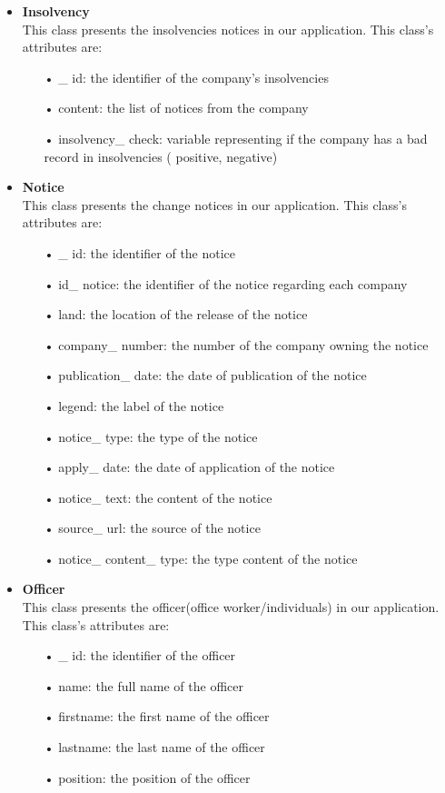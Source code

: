 \begin{itemize}
\begin{itemize}
\end{itemize}
\item \textbf{Insolvency}\\
This class presents the insolvencies notices in our application. This class's attributes are:
\begin{itemize}
\item[•] \_ id: the identifier of the company's insolvencies
\item[•] content: the list of notices from the company
\item[•] insolvency\_ check: variable representing if the company has a bad record in insolvencies ( positive, negative)
\end{itemize}
\item \textbf{Notice}\\
This class presents the change notices in our application. This class's attributes are:
\begin{itemize}
\item[•] \_ id: the identifier of the notice
\item[•] id\_ notice: the identifier of the notice regarding each company
\item[•] land: the location of the release of the notice
\item[•] company\_ number: the number of the company owning the notice
\item[•] publication\_ date: the date of publication of the notice
\item[•] legend: the label of the notice
\item[•] notice\_ type: the type of the notice
\item[•] apply\_ date: the date of application of the notice
\item[•] notice\_ text: the content of the notice
\item[•] source\_ url: the source of the notice
\item[•] notice\_ content\_ type: the type content of the notice
\end{itemize}
\item \textbf{Officer}\\
This class presents the officer(office worker/individuals) in our application. This class's attributes are:
\begin{itemize}
\item[•] \_ id: the identifier of the officer

\item[•] name: the full name of the officer
\item[•] firstname: the first name of the officer
\item[•] lastname: the last name of the officer
\item[•] position: the position of the officer


\end{itemize}
\end{itemize}
